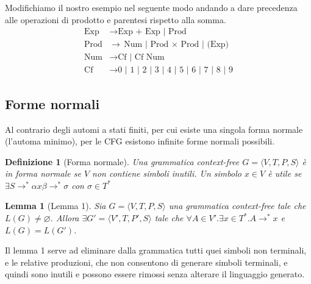 \documentclass[a4paper,titlepage]{article}
\newtheorem{lemma}{Lemma}[section]
\newtheorem{definition}{Definizione}[section]
\theoremstyle{definition}
\begin{document}
Modifichiamo il nostro esempio nel seguente modo andando a dare precedenza alle operazioni di prodotto e parentesi rispetto alla somma. 
\[
	\begin{aligned}
		\text{Exp} &\to\text{Exp + Exp | Prod} \\
		\text{Prod}&\to\text{Num | Prod $\times$ Prod | (Exp)}\\
		\text{Num}&\to\text{Cf | Cf Num} \\ 
		\text{Cf}    &\to\text{0 | 1 | 2 | 3 | 4 | 5 | 6 | 7 | 8 | 9}
	\end{aligned}
\]

\subsection{Forme normali}
Al contrario degli automi a stati finiti, per cui esiste una singola forma normale (l'automa minimo), per le CFG esistono infinite forme normali possibili. 

\begin{definition}[Forma normale]
	Una grammatica context-free $G=\langle V,T,P,S\rangle$ è in forma normale se $V$ non contiene simboli inutili. Un simbolo $x\in V$ è utile se $\exists S\rightarrow^*\alpha x\beta\rightarrow^*\sigma$ con $\sigma\in T^*$ 
\end{definition}

\begin{lemma}[Lemma 1]
	Sia $G=\langle V,T,P,S\rangle$ una grammatica context-free tale che $L(G)\neq\varnothing$. Allora $\exists G' =\langle V',T,P',S\rangle$ tale che $\forall A\in V'.\exists x\in T^*.A\rightarrow^*x$ e $L(G)=L(G')$. 
\end{lemma}

Il lemma 1 serve ad eliminare dalla grammatica tutti quei simboli non terminali, e le relative produzioni, che non consentono di generare simboli terminali, e quindi sono inutili e possono essere rimossi senza alterare il linguaggio generato. 
\end{document}
